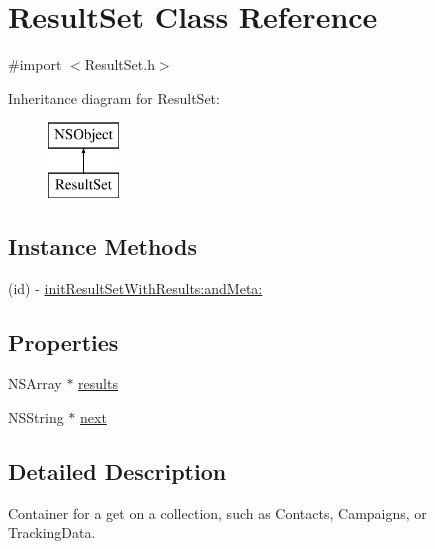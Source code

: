 \hypertarget{interface_result_set}{\section{Result\-Set Class Reference}
\label{interface_result_set}
}


{\ttfamily \#import $<$Result\-Set.\-h$>$}

Inheritance diagram for Result\-Set\-:\begin{figure}[H]
\begin{center}
\leavevmode
\includegraphics[height=2.000000cm]{interface_result_set}
\end{center}
\end{figure}
\subsection*{Instance Methods}
\begin{DoxyCompactItemize}
\item 
(id) -\/ \hyperlink{interface_result_set_a61d6e01648a2ab1d98971fd802e16af7}{init\-Result\-Set\-With\-Results\-:and\-Meta\-:}
\end{DoxyCompactItemize}
\subsection*{Properties}
\begin{DoxyCompactItemize}
\item 
N\-S\-Array $\ast$ \hyperlink{interface_result_set_a90ae624da4ec426d7315490ee4abcbb3}{results}
\item 
N\-S\-String $\ast$ \hyperlink{interface_result_set_a92b714dd2c4499ae5be35a527f51aed2}{next}
\end{DoxyCompactItemize}


\subsection{Detailed Description}
Container for a get on a collection, such as Contacts, Campaigns, or Tracking\-Data. 

